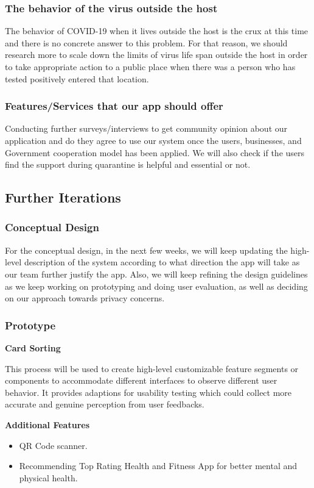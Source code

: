     \subsubsection{The behavior of the virus outside the host}
      \par The behavior of COVID-19 when it lives outside the host is the crux at this time and there is no concrete answer to this problem. For that reason, we should research more to scale down the limits of virus life span outside the host in order to take appropriate action to a public place when there was a person who has tested positively entered that location.
    \subsubsection{Features/Services that our app should offer}
      \par Conducting further surveys/interviews to get community opinion about our application and do they agree to use our system once the users, businesses, and Government cooperation model has been applied. We will also check if the users find the support during quarantine is helpful and essential or not.

  \subsection{Further Iterations}
    \subsubsection{Conceptual Design}
      \par For the conceptual design, in the next few weeks, we will keep updating the high-level description of the system according to what direction the app will take as our team further justify the app. Also, we will keep refining the design guidelines as we keep working on prototyping and doing user evaluation, as well as deciding on our approach towards privacy concerns.
    \subsubsection{Prototype}
      \vspace{0.5cm}
      \par \textbf{Card Sorting}
      \vspace{0.5cm}
      \par This process will be used to create high-level customizable feature segments or components to accommodate different interfaces to observe different user behavior. It provides adaptions for usability testing which could collect more accurate and genuine perception from user feedbacks.
      \vspace{0.5cm}
      \par \textbf{Additional Features}
      \vspace{0.5cm}
      \begin{itemize}
        \item QR Code scanner.
        \item Recommending Top Rating Health and Fitness App for better mental and physical health.
      \end{itemize}

